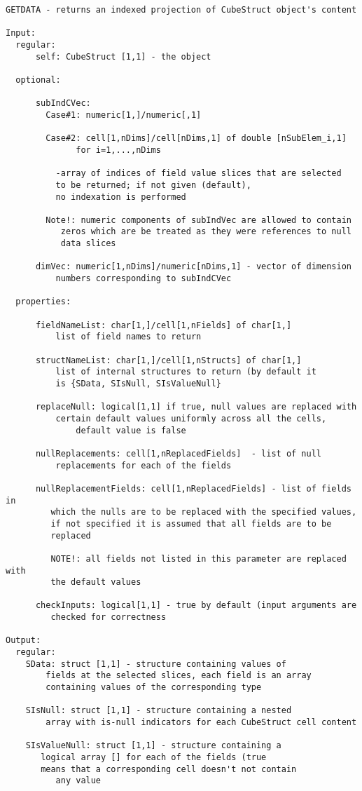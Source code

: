 \begin{verbatim}
GETDATA - returns an indexed projection of CubeStruct object's content

Input:
  regular:
      self: CubeStruct [1,1] - the object

  optional:

      subIndCVec:
        Case#1: numeric[1,]/numeric[,1]

        Case#2: cell[1,nDims]/cell[nDims,1] of double [nSubElem_i,1]
              for i=1,...,nDims

          -array of indices of field value slices that are selected
          to be returned; if not given (default),
          no indexation is performed

        Note!: numeric components of subIndVec are allowed to contain
           zeros which are be treated as they were references to null
           data slices

      dimVec: numeric[1,nDims]/numeric[nDims,1] - vector of dimension
          numbers corresponding to subIndCVec

  properties:

      fieldNameList: char[1,]/cell[1,nFields] of char[1,]
          list of field names to return

      structNameList: char[1,]/cell[1,nStructs] of char[1,]
          list of internal structures to return (by default it
          is {SData, SIsNull, SIsValueNull}

      replaceNull: logical[1,1] if true, null values are replaced with
          certain default values uniformly across all the cells,
              default value is false

      nullReplacements: cell[1,nReplacedFields]  - list of null
          replacements for each of the fields

      nullReplacementFields: cell[1,nReplacedFields] - list of fields in
         which the nulls are to be replaced with the specified values,
         if not specified it is assumed that all fields are to be
         replaced

         NOTE!: all fields not listed in this parameter are replaced with
         the default values

      checkInputs: logical[1,1] - true by default (input arguments are
         checked for correctness

Output:
  regular:
    SData: struct [1,1] - structure containing values of
        fields at the selected slices, each field is an array
        containing values of the corresponding type

    SIsNull: struct [1,1] - structure containing a nested
        array with is-null indicators for each CubeStruct cell content

    SIsValueNull: struct [1,1] - structure containing a
       logical array [] for each of the fields (true
       means that a corresponding cell doesn't not contain
          any value
\end{verbatim}

